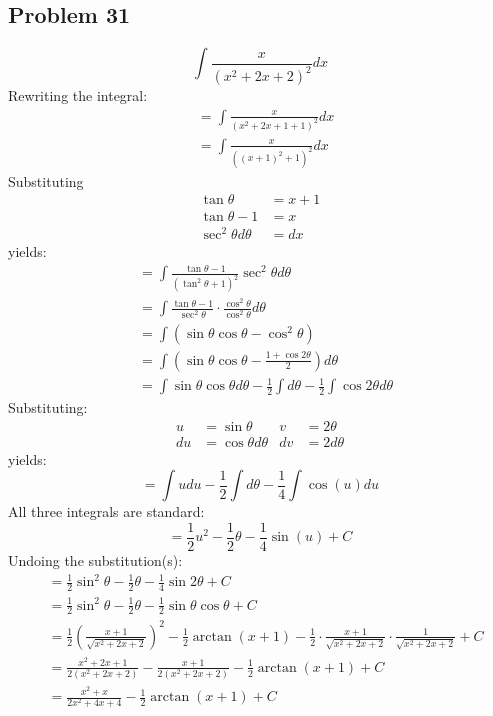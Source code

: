 \documentclass{article}
\begin{document}
\subsection*{Problem 31}
$$\int\frac{x}{\left(x^2+2x+2\right)^2}dx$$
Rewriting the integral:
\begin{align*}
&=\int\frac{x}{(x^2+2x+1+1)^2}dx \\
&=\int\frac{x}{((x+1)^2+1)^2}dx
\end{align*}
Substituting
\begin{align*}
\tan\theta&=x+1 \\
\tan\theta-1&=x \\
\sec^2\theta d\theta&=dx
\end{align*}
yields:
\begin{align*}
&=\int\frac{\tan\theta-1}{(\tan^2\theta+1)^2}\sec^2\theta d\theta \\
&=\int\frac{\tan\theta-1}{\sec^2\theta}\cdot\frac{\cos^2\theta}{\cos^2\theta}d\theta \\
&=\int\left(\sin\theta\cos\theta-\cos^2\theta\right) \\
&=\int\left(\sin\theta\cos\theta-\frac{1+\cos2\theta}{2}\right)d\theta \\
&=\int\sin\theta\cos\theta d\theta-\frac{1}{2}\int d\theta-\frac{1}{2}\int\cos2\theta d\theta
\end{align*}
Substituting:
\begin{align*}
u&=\sin\theta &v&=2\theta \\
du&=\cos\theta d\theta &dv&=2d\theta
\end{align*}
yields:
$$=\int udu-\frac{1}{2}\int d\theta-\frac{1}{4}\int\cos(u)du$$
All three integrals are standard:
$$=\frac{1}{2}u^2-\frac{1}{2}\theta-\frac{1}{4}\sin(u)+C$$
Undoing the substitution(s):
\begin{align*}
&=\frac{1}{2}\sin^2\theta-\frac{1}{2}\theta-\frac{1}{4}\sin2\theta+C \\
&=\frac{1}{2}\sin^2\theta-\frac{1}{2}\theta-\frac{1}{2}\sin\theta\cos\theta+C \\
&=\frac{1}{2}\left(\frac{x+1}{\sqrt{x^2+2x+2}}\right)^2-\frac{1}{2}\arctan(x+1)-\frac{1}{2}\cdot\frac{x+1}{\sqrt{x^2+2x+2}}\cdot\frac{1}{\sqrt{x^2+2x+2}}+C \\
&=\frac{x^2+2x+1}{2(x^2+2x+2)}-\frac{x+1}{2(x^2+2x+2)}-\frac{1}{2}\arctan(x+1)+C \\
&=\frac{x^2+x}{2x^2+4x+4}-\frac{1}{2}\arctan(x+1)+C
\end{align*}
\end{document}
